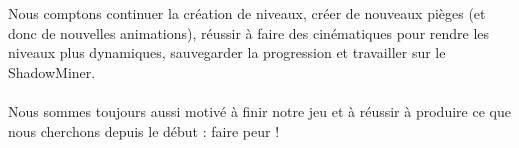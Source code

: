 \documentclass[titlepage, 13px, a4paper]{report}
\begin{document}
Nous comptons continuer la création de niveaux, créer de nouveaux pièges (et donc de nouvelles animations), réussir à faire des cinématiques 
pour rendre les niveaux plus dynamiques, sauvegarder la progression et travailler sur le ShadowMiner. \\ \\

Nous sommes toujours aussi motivé à finir notre jeu et à réussir à produire ce que nous cherchons depuis le début : faire peur ! \\ 
\end{document}
